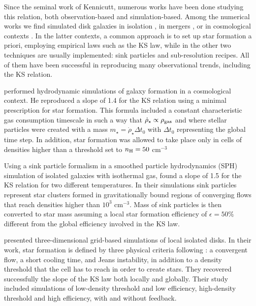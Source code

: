 \documentclass[twocolumn]{aastex}
\newcommand{\cmmm}{cm$^{-3}$}
\newcommand{\mstar}{m_\star}
\newcommand{\rhostardot}{\dot{\rho}_\star}
\newcommand{\rhogas}{\rho_{\rm gas}}
\begin{document}
Since the seminal work of Kennicutt, numerous works have been done studying this relation, both observation-based \citep{Martin_01, Wong_02, Bouche_07, Kennicutt_07, Leroy_08, Bigiel_08} and simulation-based. Among the numerical works we find simulated disk galaxies in isolation \citep{Li_05, Tasker_Bryan_06, Robertson_08, Gnedin_10}, in mergers \citep{Teyssier_10, Powell_13}, or in cosmological contexts \citep{Springel_03, Kravtsov_03, Governato_04}. In the latter contexts, a common approach is to set up star formation a priori, employing empirical laws such as the KS law, while in the other two techniques are usually implemented: sink particles and sub-resolution recipes. All of them have been successful in reproducing many observational trends, including the KS relation.

\citet{Kravtsov_03} performed hydrodynamic simulations of galaxy formation in a cosmological context. He reproduced a slope of 1.4 for the KS relation using a minimal prescription for star formation. This formula included a constant characteristic gas consumption timescale in such a way that $\rhostardot \propto \rhogas$ and where stellar particles were created with a mass $\mstar=\rhostardot \Delta t_0$ with $\Delta t_0$ representing the global time step. In addition, star formation was allowed to take place only in cells of densities higher than a threshold set to $n_{\rm H}= 50$ \cmmm

Using a sink particle formalism in a smoothed particle hydrodynamics (SPH) simulation of isolated galaxies with isothermal gas, \citet{Li_05} found a slope of 1.5 for the KS relation for two different temperatures. In their simulations sink particles represent star clusters formed in gravitationally bound regions of converging flows that reach densities higher than $10^3$ \cmmm. Mass of sink particles is then converted to star mass assuming a local star formation efficiency of $\epsilon = 50\%$ different from the global efficiency involved in the KS law.

\citet{Tasker_Bryan_06} presented three-dimensional grid-based simulations of local isolated disks. In their work, star formation is defined by three physical criteria following \citet{Cen_Ostriker_92}: a convergent flow, a short cooling time, and Jeans instability, in addition to a density threshold that the cell has to reach in order to create stars. They recovered successfully the slope of the KS law both locally and globally. Their study included simulations of low-density threshold and low efficiency, high-density threshold and high efficiency, with and without feedback.
\end{document}

